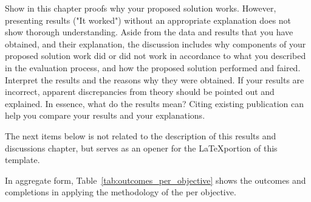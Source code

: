 
Show in this chapter proofs why your proposed solution works.  However, presenting results ("It worked") without an appropriate explanation does not show thorough understanding.  Aside from the data and results that you have obtained, and their explanation, the discussion includes why components of your proposed solution work did or did not work in accordance to what you described in the evaluation process, and how the proposed solution performed and faired. Interpret the results and the reasons why they were obtained.  If your results are incorrect, apparent discrepancies from theory should be pointed out and explained. In essence, what do the results mean?  Citing existing publication can help you compare your results and your explanations. 

The next items below is not related to the description of this results and discussions chapter, but serves as an opener for the \LaTeX portion of this template.


In aggregate form, Table~\ref{tab:outcomes_per_objective} shows the outcomes and completions in applying the methodology of the \documentType per objective. 

